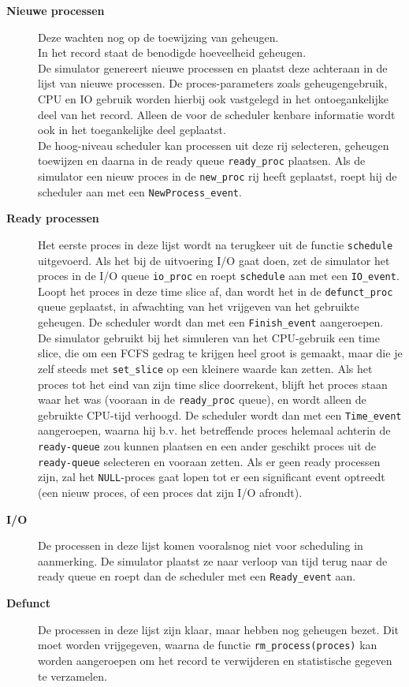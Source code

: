 \documentclass[11pt,a4paper,twoside]{article}
\begin{document}
 \begin{description}
 \item[\textbf{Nieuwe processen}] 
  Deze wachten nog op de toewijzing van geheugen.\\    
 In het record staat de benodigde hoeveelheid geheugen.\\    
 De simulator genereert nieuwe processen en plaatst deze achteraan in de
lijst van nieuwe processen. De proces-parameters zoals
geheugengebruik, CPU en IO gebruik worden hierbij ook vastgelegd in
het ontoegankelijke deel van het record. Alleen de voor de scheduler
kenbare informatie wordt ook in het toegankelijke deel geplaatst.\\    
 De hoog-niveau scheduler kan processen uit deze rij selecteren,
geheugen toewijzen en daarna in de ready queue \texttt{ready\_proc}
plaatsen. Als de simulator een nieuw proces in de \texttt{new\_proc} rij heeft
geplaatst, roept hij de scheduler aan met een \texttt{NewProcess\_event}. 
    
     \item[\textbf{Ready processen}] 
  Het eerste proces in deze lijst wordt na terugkeer uit de
functie \texttt{schedule} uitgevoerd. Als het bij de uitvoering
I/O gaat doen, zet de simulator het proces in de I/O queue \texttt{io\_proc}
en roept \texttt{schedule} aan met een \texttt{IO\_event}.
Loopt het proces in deze time slice af, dan wordt het in de \texttt{defunct\_proc}
queue geplaatst, in afwachting van het vrijgeven van het gebruikte
geheugen. De scheduler wordt dan met een \texttt{Finish\_event}
aangeroepen.\\    
 De simulator gebruikt bij het simuleren van het CPU-gebruik een
time slice, die om een FCFS gedrag te krijgen heel groot is gemaakt,
maar die je zelf steeds met \texttt{set\_slice} op een kleinere waarde kan zetten.
Als het proces tot het eind van zijn time slice
doorrekent, blijft het proces staan waar het was (vooraan in de \texttt{ready\_proc} queue),
en wordt alleen de
gebruikte CPU-tijd verhoogd. De scheduler wordt dan met een \texttt{Time\_event}
aangeroepen, waarna hij b.v. het betreffende proces helemaal
achterin de \texttt{ready-queue} zou kunnen plaatsen en een ander geschikt proces uit de \texttt{ready-queue} selecteren en vooraan zetten.
Als er geen ready processen zijn, zal het \texttt{NULL}-proces
gaat lopen tot er een significant event optreedt (een nieuw proces, of
een proces dat zijn I/O afrondt).

     \item[\textbf{I/O}] 
  De processen in deze lijst komen vooralsnog niet voor scheduling
in aanmerking. De simulator plaatst ze naar verloop van tijd terug naar
de ready queue en roept dan de scheduler met een \texttt{Ready\_event}
aan.
    
     \item[\textbf{Defunct}] 
  De processen in deze lijst zijn klaar, maar hebben nog geheugen
bezet. Dit moet worden vrijgegeven, waarna de functie \texttt{rm\_process(proces)}
kan worden aangeroepen om het record te verwijderen en statistische
gegeven te verzamelen. 
\end{description}
\end{document}
